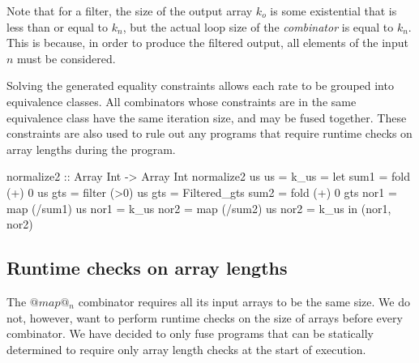 \vspace{1em}


\vspace{1em}


\vspace{1em}


Note that for a filter, the size of the output array $k_o$ is some existential that is less than or equal to $k_n$, but the actual loop size of the \emph{combinator} is equal to $k_n$.
This is because, in order to produce the filtered output, all elements of the input $n$ must be considered.

\vspace{1em}


\vspace{1em}


\vspace{1em}


\vspace{1em}

Solving the generated equality constraints allows each rate to be grouped into equivalence classes.
All combinators whose constraints are in the same equivalence class have the same iteration size, and may be fused together.
These constraints are also used to rule out any programs that require runtime checks on array lengths during the program.


\begin{code}
 normalize2 :: Array Int -> Array Int
 normalize2 us                   {us   = k_us}
  = let sum1 = fold   (+) 0 us   
        gts  = filter (>0)  us   {gts  = Filtered_gts}
        sum2 = fold   (+) 0 gts   
        nor1 = map  (/sum1) us   {nor1 = k_us}
        nor2 = map  (/sum2) us   {nor2 = k_us}
    in (nor1, nor2)
\end{code}

\subsection{Runtime checks on array lengths}
The $@map@_n$ combinator requires all its input arrays to be the same size.
We do not, however, want to perform runtime checks on the size of arrays before every combinator.
We have decided to only fuse programs that can be statically determined to require only array length checks at the start of execution. 

